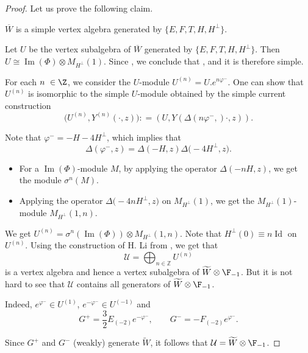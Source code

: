 \begin{proof}
Let us prove the following claim.
\begin{Claim}\label{Claim1}
 $ \overline W $ is a simple vertex algebra generated by $\big\{ E,F,T,H, H^{\perp} \big\}$.
\end{Claim}

Let $U$ be the vertex subalgebra of $\overline W $ generated by $ \big\{E,F,T,H, H^{\perp} \big\}$. Then $U \cong \operatorname{Im} (\Phi) \otimes M_{H^{\perp}} (1)$. Since , we conclude that
, and it is therefore simple.

 For each $n \in {\Z}$, we consider the $U$-module $U^{(n)} = U. e^{n \varphi^-}$. One can show that
 $ U^{(n)} $ is isomorphic to the simple $U$-module obtained by the simple current construction
\[
 \bigl(U^{(n)}, Y^{(n)} (\cdot, z)\bigr): = (U , Y(\Delta(n \varphi^-,) \cdot, z)).
 \]


 Note that $ \varphi^- = -H - 4 H^{\perp}$, which implies that
 \[%
 \Delta(\varphi^-, z) = \Delta( -H, z) \Delta\bigl(- 4 H^{\perp}, z\bigr).
 \]
 \begin{itemize}\itemsep=0pt
\item For a $ \operatorname{Im} (\Phi)$-module $M$, by applying the operator $\Delta(-nH, z)$, we get the module $\sigma^{n}( M)$.
\item Applying the operator $ \Delta\bigl( -4n H^{\perp}, z\bigr)$ on
 $ M_{H^{\perp}}(1)$, we get the $ M_{H^{\perp}}(1)$-module
$ M_{H^{\perp}} (1, n )$.
\end{itemize}

We get
$
U^{(n)}= \sigma^{n}( \operatorname{Im} (\Phi)) \otimes M_{H^{\perp}} (1,n )$.
Note that $ H^{\perp} (0) \equiv n \operatorname{Id} $ on $U^{(n)}$.
 Using the construction of H. Li from \cite{Li-ext}, we get that
\[%
 \mathcal U = \bigoplus_{n \in \mathbb{Z}} U^{(n)}
 \]
is a vertex algebra and hence a vertex subalgebra of $ \widetilde W \otimes \F_{-1}$. But it is not hard to see that $ \mathcal U$ contains all generators of $ \widetilde W \otimes \F_{-1}$.

 Indeed, $e^{\varphi^-}\in U^{(1)}$, $e^{-\varphi^-}\in U^{(-1)}$ and
 \[
 G^+ = \frac{3}{2} E_{(-2)}e^{-\varphi^-}, \qquad G^- =- F_{(-2)}e^{\varphi^-}.
 \]


Since $G^+$ and $G^-$ (weakly) generate $ \widetilde W$, it follows that
$
 \mathcal U = \widetilde W \otimes \F_{-1}$.







\end{proof}
